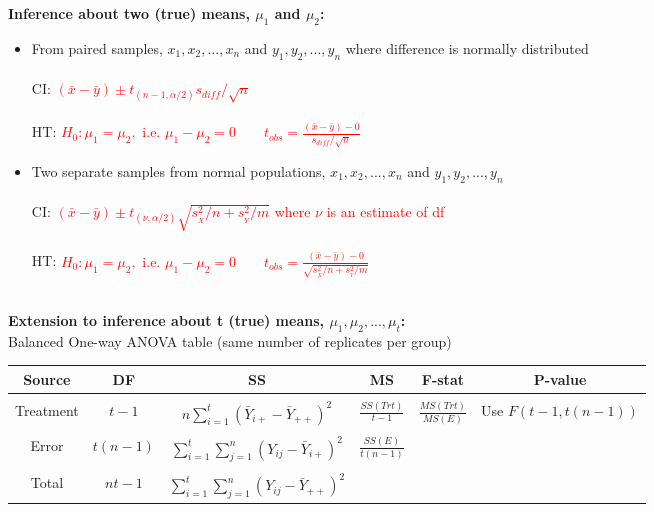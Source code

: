 \noindent\large \textbf{Inference about two (true) means, $\mu_1$ and $\mu_2$:}\normalsize\\
\begin{itemize}
\item	From paired samples, $x_1, x_2,..., x_n$ and $y_1, y_2,..., y_n$ where difference is normally distributed\\~\\
CI: \textcolor{red}{$(\bar{x}-\bar{y})\pm t_{(n-1,\alpha/2)}s_{diff}/\sqrt{n}$}\\~\\
HT: \textcolor{red}{$H_0: \mu_1=\mu_2,$ i.e. $\mu_1-\mu_2=0$~~~~$t_{obs}=\frac{(\bar{x}-\bar{y})-0}{s_{diff}/\sqrt{n}}$}
\item Two separate samples from normal populations, $x_1, x_2,..., x_n$ and $y_1, y_2,..., y_n$\\~\\
CI: \textcolor{red}{$(\bar{x}-\bar{y})\pm t_{(\nu,\alpha/2)}\sqrt{s_{_X}^2/n+s_{_Y}^2/m}$ where $\nu$ is an estimate of df}\\~\\
HT: \textcolor{red}{$H_0: \mu_1=\mu_2,$ i.e. $\mu_1-\mu_2=0$~~~~$t_{obs}=\frac{(\bar{x}-\bar{y})-0}{\sqrt{s_{_X}^2/n+s_{_Y}^2/m}}$}
\end{itemize}

~\\

\noindent\large \textbf{Extension to inference about t (true) means, $\mu_1, \mu_2, ..., \mu_t$:}\normalsize\\
Balanced One-way ANOVA table (same number of replicates per group)\\
\begin{center}
\begin{tabular}{c|c|c|c|c|c}
Source & DF & SS & MS & F-stat & P-value\\
\hline& & & & &\\
Treatment & $t-1$ & $n\sum_{i=1}^{t}(\bar{Y}_{i+}-\bar{Y}_{++})^2$ & $\frac{SS(Trt)}{t-1}$ & $\frac{MS(Trt)}{MS(E)}$ & Use $F(t-1,t(n-1))$\\& & & & &\\
Error & $t(n-1)$ & $\sum_{i=1}^{t}\sum_{j=1}^{n}(Y_{ij}-\bar{Y}_{i+})^2$ & $\frac{SS(E)}{t(n-1)}$ &  & \\& & & & &\\
Total & $nt-1$ & $\sum_{i=1}^{t}\sum_{j=1}^{n}(Y_{ij}-\bar{Y}_{++})^2$ & & & \\
\end{tabular}
\end{center}

